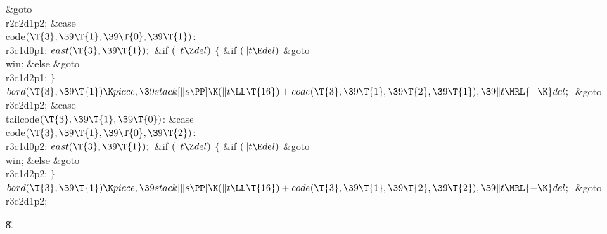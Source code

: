 \&{goto} \\{r2c2d1p2};\6
\4\&{case} \\{code}${}(\T{3},\39\T{1},\39\T{0},\39\T{1}){}$:\5
\\{r3c1d0p1}:\5
${}\\{east}(\T{3},\39\T{1});{}$\6
\&{if} ${}(\|t\Z\\{del}){}$\5
${}\{{}$\5
\1\&{if} ${}(\|t\E\\{del}){}$\1\5
\&{goto} \\{win};\5
\2\&{else}\1\5
\&{goto} \\{r3c1d2p1};\5
\2${}\}{}$\2\6
${}\\{bord}(\T{3},\39\T{1})\K\\{piece},\39\\{stack}[\|s\PP]\K(\|t\LL\T{16})+%
\\{code}(\T{3},\39\T{1},\39\T{2},\39\T{1}),\39\|t\MRL{-{\K}}\\{del};{}$\6
\&{goto} \\{r3c2d1p2};\6
\4\&{case} \\{tailcode}${}(\T{3},\39\T{1},\39\T{0}){}$:\5
\&{case} \\{code}${}(\T{3},\39\T{1},\39\T{0},\39\T{2}){}$:\5
\\{r3c1d0p2}:\5
${}\\{east}(\T{3},\39\T{1});{}$\6
\&{if} ${}(\|t\Z\\{del}){}$\5
${}\{{}$\5
\1\&{if} ${}(\|t\E\\{del}){}$\1\5
\&{goto} \\{win};\5
\2\&{else}\1\5
\&{goto} \\{r3c1d2p2};\5
\2${}\}{}$\2\6
${}\\{bord}(\T{3},\39\T{1})\K\\{piece},\39\\{stack}[\|s\PP]\K(\|t\LL\T{16})+%
\\{code}(\T{3},\39\T{1},\39\T{2},\39\T{2}),\39\|t\MRL{-{\K}}\\{del};{}$\6
\&{goto} \\{r3c2d1p2};\par
\U8.\fi

